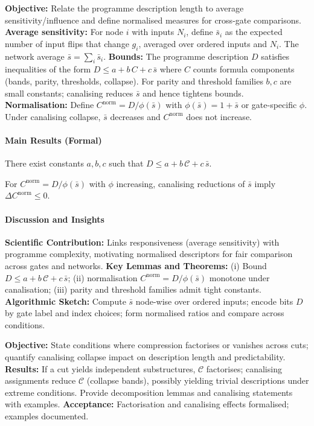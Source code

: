 \textbf{Objective:} Relate the programme description length to average sensitivity/influence and define normalised measures for cross-gate comparisons.
\textbf{Average sensitivity:} For node \(i\) with inputs \(N_i\), define \(\bar{s}_i\) as the expected number of input flips that change \(g_i\), averaged over ordered inputs and \(N_i\). The network average \(\bar{s}=\sum_i \bar{s}_i\).
\textbf{Bounds:} The programme description \(D\) satisfies inequalities of the form \(D \le a + b\,C + c\,\bar{s}\) where \(C\) counts formula components (bands, parity, thresholds, collapse). For parity and threshold families \(b,c\) are small constants; canalising reduces \(\bar{s}\) and hence tightens bounds.
\textbf{Normalisation:} Define \(C^{\mathrm{norm}}=D/\phi(\bar{s})\) with \(\phi(\bar{s})=1+\bar{s}\) or gate-specific \(\phi\). Under canalising collapse, \(\bar{s}\) decreases and \(C^{\mathrm{norm}}\) does not increase.
\paragraph{Main Results (Formal)}
\begin{theorem}
There exist constants \(a,b,c\) such that \(D \le a + b\,\mathcal{C} + c\,\bar{s}\).
\end{theorem}
\begin{lemma}
For \(C^{\mathrm{norm}}=D/\phi(\bar{s})\) with \(\phi\) increasing, canalising reductions of \(\bar{s}\) imply \(\Delta C^{\mathrm{norm}}\le 0\).
\end{lemma}
\paragraph{Discussion and Insights}
\textbf{Scientific Contribution:} Links responsiveness (average sensitivity) with programme complexity, motivating normalised descriptors for fair comparison across gates and networks.
\textbf{Key Lemmas and Theorems:} (i) Bound \(D \le a + b\,\mathcal{C} + c\,\bar{s}\); (ii) normalisation \(C^{\mathrm{norm}}=D/\phi(\bar{s})\) monotone under canalisation; (iii) parity and threshold families admit tight constants.
\textbf{Algorithmic Sketch:} Compute \(\bar{s}\) node-wise over ordered inputs; encode bits \(D\) by gate label and index choices; form normalised ratios and compare across conditions.

\textbf{Objective:} State conditions where compression factorises or vanishes across cuts; quantify canalising collapse impact on description length and predictability.
\textbf{Results:} If a cut yields independent substructures, \(\mathcal{C}\) factorises; canalising assignments reduce \(\mathcal{C}\) (collapse bands), possibly yielding trivial descriptions under extreme conditions. Provide decomposition lemmas and canalising statements with examples.
\textbf{Acceptance:} Factorisation and canalising effects formalised; examples documented.
